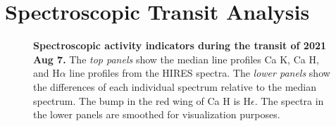 \documentclass[12pt,modern,twocolumn,tighten]{aastex63}
\begin{document}
%  
%  






\section{Spectroscopic Transit Analysis}
\label{app:rm}

\begin{figure}[tp]
	\begin{center}
		\leavevmode
	\end{center}
	\vspace{-0.5cm}
	\caption{
    {\bf Spectroscopic activity indicators during the transit of 2021
    Aug 7.} The {\it top panels} show the median line profiles Ca K,
    Ca H, and H$\alpha$ line profiles from the HIRES spectra.  The
    {\it lower panels} show the differences of each individual
    spectrum relative to the median spectrum.  The bump in the red
    wing of Ca H is H$\epsilon$.  The spectra in the lower panels are
    smoothed for visualization purposes.
    \label{fig:rvactivity}
	}
\end{figure}
\end{document}
